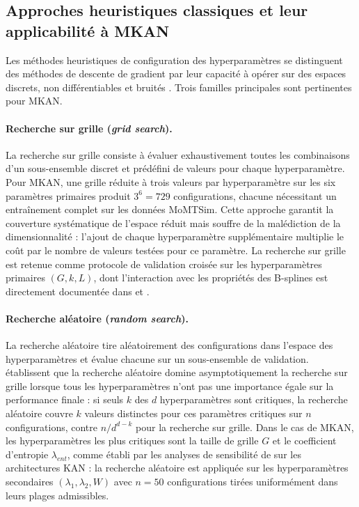 \documentclass[11pt,a4paper,oneside]{report}
\theoremstyle{definition}
\theoremstyle{remark}
\begin{document}
\subsection{Approches heuristiques classiques et leur applicabilité à MKAN}

Les méthodes heuristiques de configuration des hyperparamètres se distinguent des méthodes de descente de gradient par leur capacité à opérer sur des espaces discrets, non différentiables et bruités \citep{haosol2024meta}. Trois familles principales sont pertinentes pour MKAN.

\paragraph{Recherche sur grille (\textit{grid search}).}
La recherche sur grille consiste à évaluer exhaustivement toutes les combinaisons d'un sous-ensemble discret et prédéfini de valeurs pour chaque hyperparamètre. Pour MKAN, une grille réduite à trois valeurs par hyperparamètre sur les six paramètres primaires produit $3^6 = 729$ configurations, chacune nécessitant un entraînement complet sur les données MoMTSim. Cette approche garantit la couverture systématique de l'espace réduit mais souffre de la malédiction de la dimensionnalité : l'ajout de chaque hyperparamètre supplémentaire multiplie le coût par le nombre de valeurs testées pour ce paramètre. La recherche sur grille est retenue comme protocole de validation croisée sur les hyperparamètres primaires $(G, k, L)$, dont l'interaction avec les propriétés des B-splines est directement documentée dans \citet{liu2024kan} et \citet{somvanshi2025survey}.

\paragraph{Recherche aléatoire (\textit{random search}).}
La recherche aléatoire tire aléatoirement des configurations dans l'espace des hyperparamètres et évalue chacune sur un sous-ensemble de validation. \citet{haosol2024meta} établissent que la recherche aléatoire domine asymptotiquement la recherche sur grille lorsque tous les hyperparamètres n'ont pas une importance égale sur la performance finale : si seuls $k$ des $d$ hyperparamètres sont critiques, la recherche aléatoire couvre $k$ valeurs distinctes pour ces paramètres critiques sur $n$ configurations, contre $n/d^{d-k}$ pour la recherche sur grille. Dans le cas de MKAN, les hyperparamètres les plus critiques sont la taille de grille $G$ et le coefficient d'entropie $\lambda_{ent}$, comme établi par les analyses de sensibilité de \citet{hou2024critical} sur les architectures KAN : la recherche aléatoire est appliquée sur les hyperparamètres secondaires $(\lambda_1, \lambda_2, W)$ avec $n = 50$ configurations tirées uniformément dans leurs plages admissibles.
\end{document}
